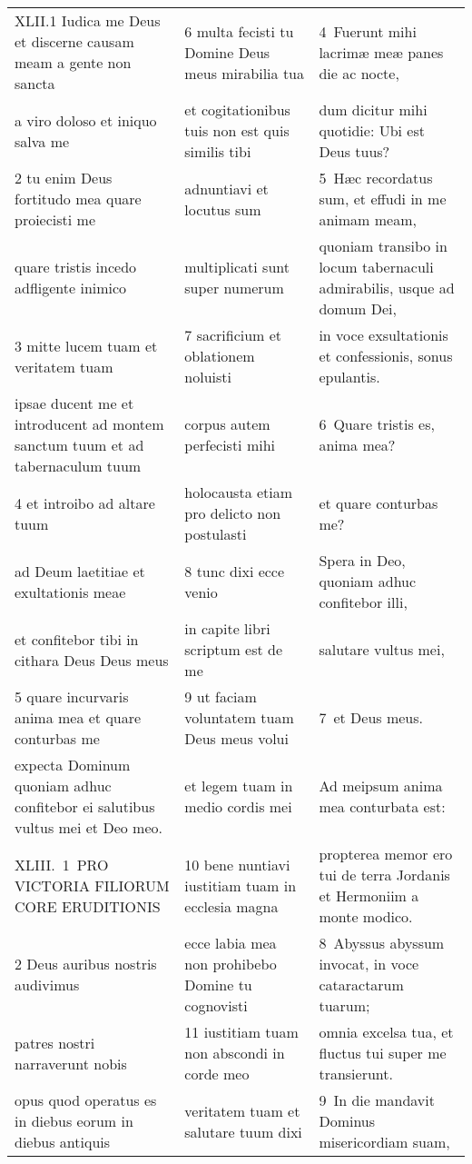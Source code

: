 \documentclass{article}
\begin{document}
\begin{longtable}{@{}p{}p{}p{}@{}}
XLII.1 Iudica me Deus et discerne causam meam a gente non sancta	&	6 multa fecisti tu Domine Deus meus mirabilia tua	&	4 Fuerunt mihi lacrimæ meæ panes die ac nocte,	\\
a viro doloso et iniquo salva me	&	et cogitationibus tuis non est quis similis tibi	&	dum dicitur mihi quotidie: Ubi est Deus tuus?	\\
2 tu enim Deus fortitudo mea quare proiecisti me	&	adnuntiavi et locutus sum	&	5 Hæc recordatus sum, et effudi in me animam meam,	\\
quare tristis incedo adfligente inimico	&	multiplicati sunt super numerum	&	quoniam transibo in locum tabernaculi admirabilis, usque ad domum Dei,	\\
3 mitte lucem tuam et veritatem tuam	&	7 sacrificium et oblationem noluisti	&	in voce exsultationis et confessionis, sonus epulantis.	\\
ipsae ducent me et introducent ad montem sanctum tuum et ad tabernaculum tuum	&	corpus autem perfecisti mihi	&	6 Quare tristis es, anima mea?	\\
4 et introibo ad altare tuum	&	holocausta etiam pro delicto non postulasti	&	et quare conturbas me?	\\
ad Deum laetitiae et exultationis meae	&	8 tunc dixi ecce venio	&	Spera in Deo, quoniam adhuc confitebor illi,	\\
et confitebor tibi in cithara Deus Deus meus	&	in capite libri scriptum est de me	&	salutare vultus mei,	\\
5 quare incurvaris anima mea et quare conturbas me	&	9 ut faciam voluntatem tuam Deus meus volui	&	7 et Deus meus.	\\
expecta Dominum quoniam adhuc confitebor ei salutibus vultus mei et Deo meo.	&	et legem tuam in medio cordis mei	&	Ad meipsum anima mea conturbata est:	\\
XLIII. 1 PRO VICTORIA FILIORUM CORE ERUDITIONIS	&	10 bene nuntiavi iustitiam tuam in ecclesia magna	&	propterea memor ero tui de terra Jordanis et Hermoniim a monte modico.	\\
2 Deus auribus nostris audivimus	&	ecce labia mea non prohibebo Domine tu cognovisti	&	8 Abyssus abyssum invocat, in voce cataractarum tuarum;	\\
patres nostri narraverunt nobis	&	11 iustitiam tuam non abscondi in corde meo	&	omnia excelsa tua, et fluctus tui super me transierunt.	\\
opus quod operatus es in diebus eorum in diebus antiquis	&	veritatem tuam et salutare tuum dixi	&	9 In die mandavit Dominus misericordiam suam,	\\

\end{longtable}
\end{document}

